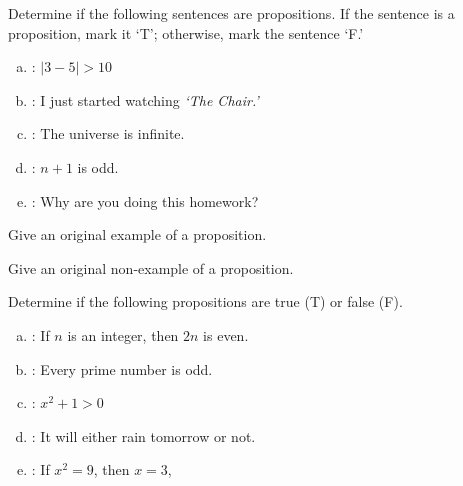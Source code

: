 \documentclass[11pt,letterpaper]{article}
\begin{document}
\homework{}

 Determine if the following sentences are propositions. If the sentence is a proposition, mark it `T'; otherwise, mark the sentence `F.'
	\begin{enumerate}[(a)]
	\item \uans{1.5cm}: $|3 - 5| > 10$
	\item \uans{1.5cm}: I just started watching \textit{`The Chair.'}
	\item \uans{1.5cm}: The universe is infinite.
	\item \uans{1.5cm}: $n + 1$ is odd.  
	\item \uans{1.5cm}: Why are you doing this homework?
	\end{enumerate}





\newpage





 Give an original example of a proposition. \pspace





\newpage





 Give an original non-example of a proposition. \pspace





\newpage





 Determine if the following propositions are true (T) or false (F). 
	\begin{enumerate}[(a)]
	\item \uans{1.5cm}: If $n$ is an integer, then $2n$ is even.
	\item \uans{1.5cm}: Every prime number is odd.
	\item \uans{1.5cm}: $x^2 + 1 > 0$
	\item \uans{1.5cm}: It will either rain tomorrow or not.
	\item \uans{1.5cm}: If $x^2= 9$, then $x= 3$,
	\end{enumerate}





\newpage
\end{document}
